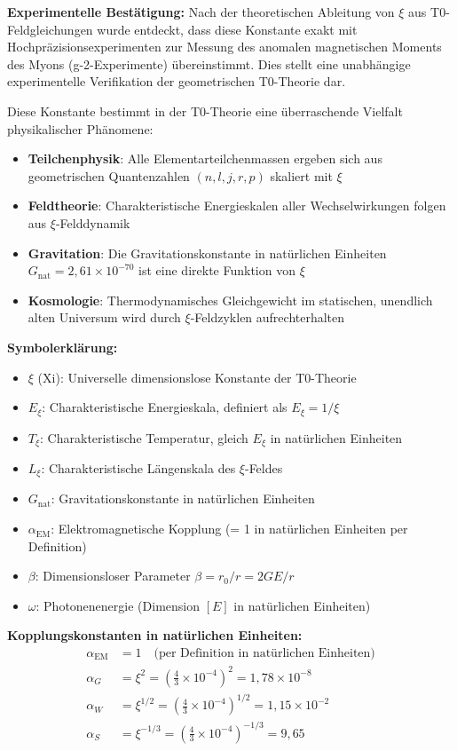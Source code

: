 	\textbf{Experimentelle Bestätigung:} Nach der theoretischen Ableitung von $\xi$ aus T0-Feldgleichungen wurde entdeckt, dass diese Konstante exakt mit Hochpräzisionsexperimenten zur Messung des anomalen magnetischen Moments des Myons (g-2-Experimente) übereinstimmt. Dies stellt eine unabhängige experimentelle Verifikation der geometrischen T0-Theorie dar.
	
	Diese Konstante bestimmt in der T0-Theorie eine überraschende Vielfalt physikalischer Phänomene:
	\begin{itemize}
		\item \textbf{Teilchenphysik}: Alle Elementarteilchenmassen ergeben sich aus geometrischen Quantenzahlen $(n,l,j,r,p)$ skaliert mit $\xi$
		\item \textbf{Feldtheorie}: Charakteristische Energieskalen aller Wechselwirkungen folgen aus $\xi$-Felddynamik
		\item \textbf{Gravitation}: Die Gravitationskonstante in natürlichen Einheiten $G_{\text{nat}} = 2{,}61 \times 10^{-70}$ ist eine direkte Funktion von $\xi$
		\item \textbf{Kosmologie}: Thermodynamisches Gleichgewicht im statischen, unendlich alten Universum wird durch $\xi$-Feldzyklen aufrechterhalten
	\end{itemize}
	
	\textbf{Symbolerklärung:}
	\begin{itemize}
		\item $\xi$ (Xi): Universelle dimensionslose Konstante der T0-Theorie
		\item $E_\xi$: Charakteristische Energieskala, definiert als $E_\xi = 1/\xi$
		\item $T_\xi$: Charakteristische Temperatur, gleich $E_\xi$ in natürlichen Einheiten
		\item $L_\xi$: Charakteristische Längenskala des $\xi$-Feldes
		\item $G_{\text{nat}}$: Gravitationskonstante in natürlichen Einheiten
		\item $\alpha_{\text{EM}}$: Elektromagnetische Kopplung (= 1 in natürlichen Einheiten per Definition)
		\item $\beta$: Dimensionsloser Parameter $\beta = r_0/r = 2GE/r$
		\item $\omega$: Photonenenergie (Dimension $[E]$ in natürlichen Einheiten)
	\end{itemize}
	
	\textbf{Kopplungskonstanten in natürlichen Einheiten:}
	\begin{align}
		\alpha_{\text{EM}} &= 1 \quad \text{(per Definition in natürlichen Einheiten)} \\
		\alpha_G &= \xi^2 = \left(\frac{4}{3} \times 10^{-4}\right)^2 = 1{,}78 \times 10^{-8} \\
		\alpha_W &= \xi^{1/2} = \left(\frac{4}{3} \times 10^{-4}\right)^{1/2} = 1{,}15 \times 10^{-2} \\
		\alpha_S &= \xi^{-1/3} = \left(\frac{4}{3} \times 10^{-4}\right)^{-1/3} = 9{,}65
	\end{align}
	
